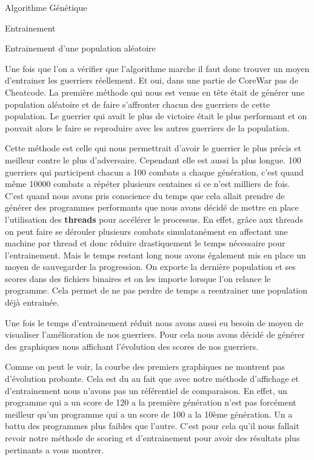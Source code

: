 \documentclass[a4paper, 10pt]{article}
\begin{document}
\begin{section}{Algorithme Génétique}
\begin{subsection}{Entrainement}
                \begin{subsubsection}{Entrainement d'une population aléatoire}
                    \par
                        Une fois que l'on a vérifier que l'algorithme marche il faut donc trouver un moyen d'entrainer les guerriers réellement. Et oui, dans une partie de CoreWar pas de Cheatcode. La première méthode qui nous est venue en tête était de générer une population aléatoire et de faire s'affronter chacun des guerriers de cette population. Le guerrier qui avait le plus de victoire était le plus performant et on pouvait alors le faire se reproduire avec les autres guerriers de la population.
                        \medskip
                    \par
                        Cette méthode est celle qui nous permettrait d'avoir le guerrier le plus précis et meilleur contre le plus d'adversaire. Cependant elle est aussi la plus longue. 100 guerriers qui participent chacun a 100 combats a chaque génération, c'est quand même 10000 combats a répéter plusieurs centaines si ce n'est milliers de fois. C'est quand nous avons pris conscience du temps que cela allait prendre de générer des programmes performants que nous avons décidé de mettre en place l'utilisation des \textbf{threads} pour accélérer le processus. En effet, grâce aux threads on peut faire se dérouler plusieurs combats simulatanément en affectant une machine par thread et donc réduire drastiquement le temps nécessaire pour l'entrainement. Mais le temps restant long nous avons également mis en place un moyen de sauvegarder la progression. On exporte la dernière population et ses scores dans des fichiers binaires et on les importe lorsque l'on relance le programme. Cela permet de ne pas perdre de temps a reentrainer une population déjà entrainée.
                        \medskip
                    \par
                        Une fois le temps d'entrainement réduit nous avons aussi eu besoin de moyen de visualiser l'amélioration de nos guerriers. Pour cela nous avons décidé de générer des graphiques nous affichant l'évolution des scores de nos guerriers.
                        \medskip

                    \par
                        Comme on peut le voir, la courbe des premiers graphiques ne montrent pas d'évolution probante. Cela est du au fait que avec notre méthode d'affichage et d'entrainement nous n'avons pas un référentiel de comparaison. En effet, un programme qui a un score de 120 a la première génération n'est pas forcément meilleur qu'un programme qui a un score de 100 a la 10ème génération. Un a battu des programmes plus faibles que l'autre. C'est pour cela qu'il nous fallait revoir notre méthode de scoring et d'entrainement pour avoir des résultats plus pertinants a vous montrer.


\end{subsubsection}
\end{subsection}
\end{section}
\end{document}
